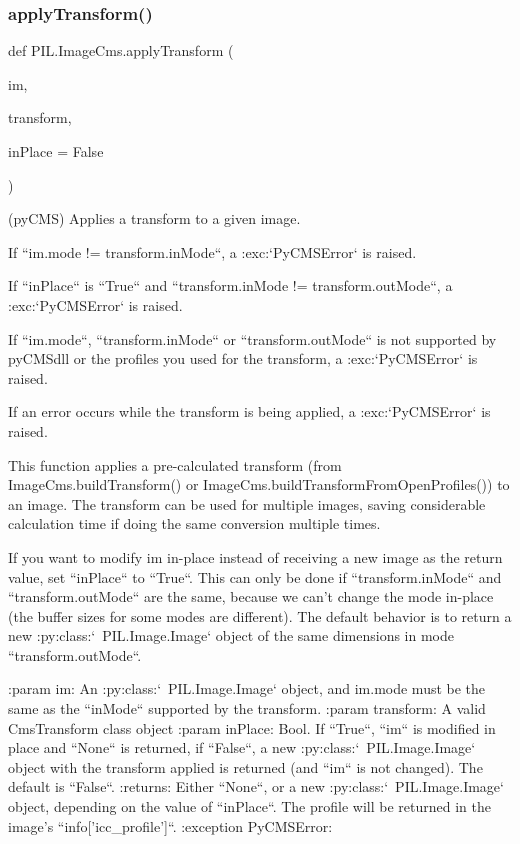 \subsubsection{\texorpdfstring{apply\+Transform()}{applyTransform()}}
{\footnotesize\ttfamily def P\+I\+L.\+Image\+Cms.\+apply\+Transform (\begin{DoxyParamCaption}\item[{}]{im,  }\item[{}]{transform,  }\item[{}]{in\+Place = {\ttfamily False} }\end{DoxyParamCaption})}

\begin{DoxyVerb}(pyCMS) Applies a transform to a given image.

If ``im.mode != transform.inMode``, a :exc:`PyCMSError` is raised.

If ``inPlace`` is ``True`` and ``transform.inMode != transform.outMode``, a
:exc:`PyCMSError` is raised.

If ``im.mode``, ``transform.inMode`` or ``transform.outMode`` is not
supported by pyCMSdll or the profiles you used for the transform, a
:exc:`PyCMSError` is raised.

If an error occurs while the transform is being applied,
a :exc:`PyCMSError` is raised.

This function applies a pre-calculated transform (from
ImageCms.buildTransform() or ImageCms.buildTransformFromOpenProfiles())
to an image. The transform can be used for multiple images, saving
considerable calculation time if doing the same conversion multiple times.

If you want to modify im in-place instead of receiving a new image as
the return value, set ``inPlace`` to ``True``.  This can only be done if
``transform.inMode`` and ``transform.outMode`` are the same, because we can't
change the mode in-place (the buffer sizes for some modes are
different).  The default behavior is to return a new :py:class:`~PIL.Image.Image`
object of the same dimensions in mode ``transform.outMode``.

:param im: An :py:class:`~PIL.Image.Image` object, and im.mode must be the same
    as the ``inMode`` supported by the transform.
:param transform: A valid CmsTransform class object
:param inPlace: Bool.  If ``True``, ``im`` is modified in place and ``None`` is
    returned, if ``False``, a new :py:class:`~PIL.Image.Image` object with the
    transform applied is returned (and ``im`` is not changed). The default is
    ``False``.
:returns: Either ``None``, or a new :py:class:`~PIL.Image.Image` object,
    depending on the value of ``inPlace``. The profile will be returned in
    the image's ``info['icc_profile']``.
:exception PyCMSError:
\end{DoxyVerb}
 \mbox{\label{namespacePIL_1_1ImageCms_a2dce417677d028e83a5e48c94f1b8d80}} 
